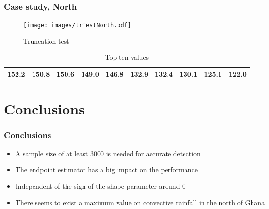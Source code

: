 \documentclass{beamer}
\begin{document}
\begin{frame}
\frametitle{Case study, North}
\begin{figure}
\texttt{[image: images/trTestNorth.pdf]}
\caption{Truncation test}
\end{figure}
\begin{table}[H]
\centering
\tiny
\begin{tabular}{|c c c c c c c c c c|}
	\hline
	152.2 & 150.8 & 150.6 & 149.0 & 146.8 & 132.9 & 132.4 & 130.1 & 125.1 & 122.0\\
	\hline
\end{tabular}
\caption{Top ten values}
\label{Top10South}
\end{table}
\end{frame}

\section{Conclusions}

\begin{frame}
\frametitle{Conclusions}
\begin{itemize}
	\item A sample size of at least 3000 is needed for accurate detection
	\item The endpoint estimator has a big impact on the performance
	\item Independent of the sign of the shape parameter around 0
	\item There seems to exist a maximum value on convective rainfall in the north of Ghana
\end{itemize}
\end{frame}
\end{document}
